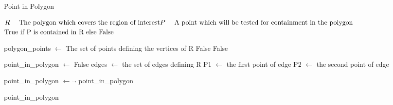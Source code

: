 \begin{algorithm}[H]{}
\caption{Point-in-Polygon}
\label{alg:PointInPolygon}
\begin{algorithmic}[1]
\renewcommand{\algorithmicrequire}{\textbf{Input:}}
\renewcommand{\algorithmicensure}{\textbf{Output:}}
\REQUIRE $ \newline R \quad \text{ The polygon which covers the region of interest}
\newline P \quad \text{ A point which will be tested for containment in the polygon }
$
\ENSURE $\newline \text{True if P is contained in R else False }$

\hfill\pagebreak
\STATE polygon\_points $\leftarrow$ The set of points defining the vertices of R
\RETURN False
\RETURN False



\ELSE
\STATE point\_in\_polygon $\leftarrow$ False
\STATE edges $\leftarrow$ the set of edges defining R
\STATE P1 $\leftarrow$ the first point of edge
\STATE P2 $\leftarrow$ the second point of edge

\STATE point\_in\_polygon $\leftarrow \neg$ point\_in\_polygon
\ENDIF

\ENDFOR
\ENDIF
\RETURN point\_in\_polygon
\end{algorithmic} 
\end{algorithm}


